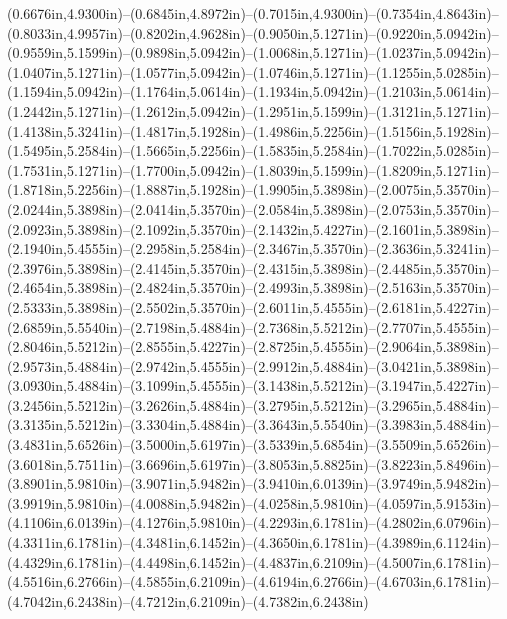 (0.6676in,4.9300in)--(0.6845in,4.8972in)--(0.7015in,4.9300in)--(0.7354in,4.8643in)--(0.8033in,4.9957in)--(0.8202in,4.9628in)--(0.9050in,5.1271in)--(0.9220in,5.0942in)--(0.9559in,5.1599in)--(0.9898in,5.0942in)--(1.0068in,5.1271in)--(1.0237in,5.0942in)--(1.0407in,5.1271in)--(1.0577in,5.0942in)--(1.0746in,5.1271in)--(1.1255in,5.0285in)--(1.1594in,5.0942in)--(1.1764in,5.0614in)--(1.1934in,5.0942in)--(1.2103in,5.0614in)--(1.2442in,5.1271in)--(1.2612in,5.0942in)--(1.2951in,5.1599in)--(1.3121in,5.1271in)--(1.4138in,5.3241in)--(1.4817in,5.1928in)--(1.4986in,5.2256in)--(1.5156in,5.1928in)--(1.5495in,5.2584in)--(1.5665in,5.2256in)--(1.5835in,5.2584in)--(1.7022in,5.0285in)--(1.7531in,5.1271in)--(1.7700in,5.0942in)--(1.8039in,5.1599in)--(1.8209in,5.1271in)--(1.8718in,5.2256in)--(1.8887in,5.1928in)--(1.9905in,5.3898in)--(2.0075in,5.3570in)--(2.0244in,5.3898in)--(2.0414in,5.3570in)--(2.0584in,5.3898in)--(2.0753in,5.3570in)--(2.0923in,5.3898in)--(2.1092in,5.3570in)--(2.1432in,5.4227in)--(2.1601in,5.3898in)--(2.1940in,5.4555in)--(2.2958in,5.2584in)--(2.3467in,5.3570in)--(2.3636in,5.3241in)--(2.3976in,5.3898in)--(2.4145in,5.3570in)--(2.4315in,5.3898in)--(2.4485in,5.3570in)--(2.4654in,5.3898in)--(2.4824in,5.3570in)--(2.4993in,5.3898in)--(2.5163in,5.3570in)--(2.5333in,5.3898in)--(2.5502in,5.3570in)--(2.6011in,5.4555in)--(2.6181in,5.4227in)--(2.6859in,5.5540in)--(2.7198in,5.4884in)--(2.7368in,5.5212in)--(2.7707in,5.4555in)--(2.8046in,5.5212in)--(2.8555in,5.4227in)--(2.8725in,5.4555in)--(2.9064in,5.3898in)--(2.9573in,5.4884in)--(2.9742in,5.4555in)--(2.9912in,5.4884in)--(3.0421in,5.3898in)--(3.0930in,5.4884in)--(3.1099in,5.4555in)--(3.1438in,5.5212in)--(3.1947in,5.4227in)--(3.2456in,5.5212in)--(3.2626in,5.4884in)--(3.2795in,5.5212in)--(3.2965in,5.4884in)--(3.3135in,5.5212in)--(3.3304in,5.4884in)--(3.3643in,5.5540in)--(3.3983in,5.4884in)--(3.4831in,5.6526in)--(3.5000in,5.6197in)--(3.5339in,5.6854in)--(3.5509in,5.6526in)--(3.6018in,5.7511in)--(3.6696in,5.6197in)--(3.8053in,5.8825in)--(3.8223in,5.8496in)--(3.8901in,5.9810in)--(3.9071in,5.9482in)--(3.9410in,6.0139in)--(3.9749in,5.9482in)--(3.9919in,5.9810in)--(4.0088in,5.9482in)--(4.0258in,5.9810in)--(4.0597in,5.9153in)--(4.1106in,6.0139in)--(4.1276in,5.9810in)--(4.2293in,6.1781in)--(4.2802in,6.0796in)--(4.3311in,6.1781in)--(4.3481in,6.1452in)--(4.3650in,6.1781in)--(4.3989in,6.1124in)--(4.4329in,6.1781in)--(4.4498in,6.1452in)--(4.4837in,6.2109in)--(4.5007in,6.1781in)--(4.5516in,6.2766in)--(4.5855in,6.2109in)--(4.6194in,6.2766in)--(4.6703in,6.1781in)--(4.7042in,6.2438in)--(4.7212in,6.2109in)--(4.7382in,6.2438in) 